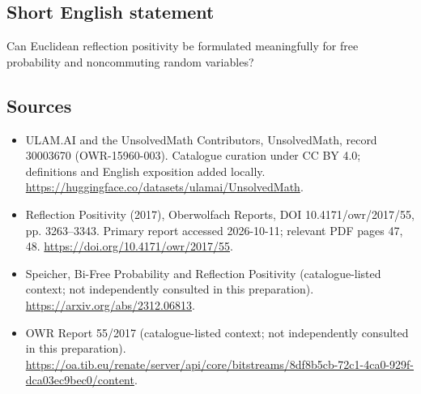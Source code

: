 \documentclass[11pt]{article}
\begin{document}
\subsection{Short English statement}
Can Euclidean reflection positivity be formulated meaningfully for free probability and noncommuting random variables?
\subsection{Sources}
\begin{itemize}
\item[\hypertarget{source:30003670:1}{S1}] ULAM.AI and the UnsolvedMath Contributors, UnsolvedMath, record 30003670 (OWR-15960-003). Catalogue curation under CC BY 4.0; definitions and English exposition added locally.
\url{https://huggingface.co/datasets/ulamai/UnsolvedMath}.
\item[\hypertarget{source:30003670:2}{S2}] Reflection Positivity (2017), Oberwolfach Reports, DOI 10.4171/owr/2017/55, pp. 3263--3343. Primary report accessed 2026-10-11; relevant PDF pages 47, 48.
\url{https://doi.org/10.4171/owr/2017/55}.
\item[\hypertarget{source:30003670:3}{S3}] Speicher, Bi-Free Probability and Reflection Positivity (catalogue-listed context; not independently consulted in this preparation).
\url{https://arxiv.org/abs/2312.06813}.
\item[\hypertarget{source:30003670:4}{S4}] OWR Report 55/2017 (catalogue-listed context; not independently consulted in this preparation).
\url{https://oa.tib.eu/renate/server/api/core/bitstreams/8df8b5cb-72c1-4ca0-929f-dca03ec9bec0/content}.
\end{itemize}
\label{end:30003670}
\end{document}
